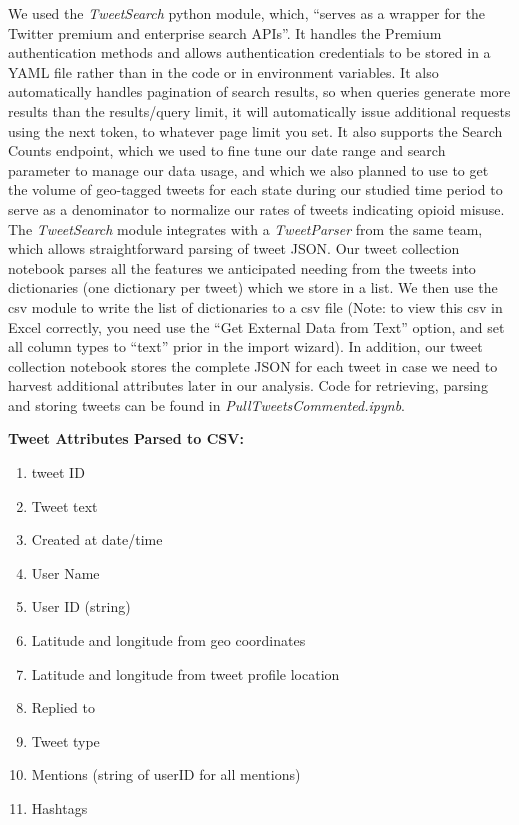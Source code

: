 \documentclass[sigconf]{acmart}
\begin{document}

We used the \emph{TweetSearch} python module, which, ``serves as 
a wrapper for the Twitter premium and enterprise search APIs''\cite{pkgRef1}. 
It handles the Premium authentication methods and allows authentication 
credentials to be stored in a YAML file rather than in the code or in 
environment variables. It also automatically handles pagination of search 
results, so when queries generate more results than the results/query limit, 
it will automatically issue additional requests using the next token, to 
whatever page limit you set. It also supports the Search Counts endpoint, 
which we used to fine tune our date range and search parameter to manage our 
data usage, and which we also planned to use to get the volume of geo-tagged 
tweets for each state during our studied time period to serve as a 
denominator to normalize our rates of tweets indicating opioid misuse. The 
\emph{TweetSearch} module integrates with a \emph{TweetParser} \cite{pkgRef2} 
from the same team, which allows straightforward parsing of tweet JSON. 
Our tweet collection notebook parses all the features we anticipated needing 
from the tweets into dictionaries (one dictionary per tweet) which we store 
in a list. We then use the csv module to write the list of dictionaries to 
a csv file (Note: to view this csv in Excel correctly, you need use the 
``Get External Data from Text'' option, and set all column types to ``text'' 
prior in the import wizard). In addition, our tweet collection notebook 
stores the complete JSON for each tweet in case we need to harvest 
additional attributes later in our analysis. Code for retrieving, parsing 
and storing tweets can be found in \emph{PullTweetsCommented.ipynb}.
 
\textbf{Tweet Attributes Parsed to CSV:}
\begin{enumerate}
  \item tweet ID
  \item Tweet text  
  \item Created at date/time
  \item User Name
  \item User ID (string)
  \item Latitude and longitude from geo coordinates
  \item Latitude and longitude from tweet profile location
  \item Replied to
  \item Tweet type
  \item Mentions (string of userID for all mentions)
  \item Hashtags
\end{enumerate} 
\end{document}
